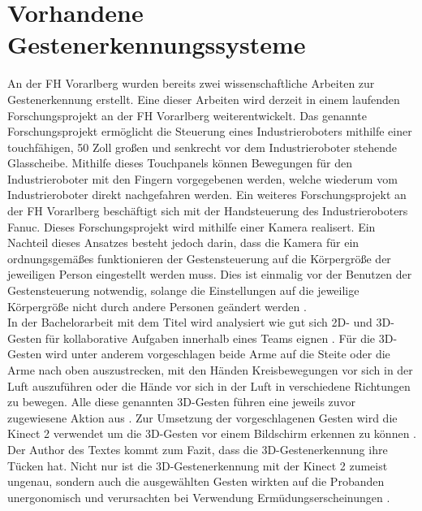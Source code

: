 

\section{Vorhandene Gestenerkennungssysteme}
An der FH Vorarlberg wurden bereits zwei wissenschaftliche Arbeiten zur Gestenerkennung erstellt. Eine dieser Arbeiten wird derzeit in einem laufenden Forschungsprojekt an der FH Vorarlberg weiterentwickelt. Das genannte Forschungsprojekt ermöglicht die Steuerung eines Industrieroboters mithilfe einer touchfähigen, 50 Zoll großen und senkrecht vor dem Industrieroboter stehende Glasscheibe. Mithilfe dieses Touchpanels können Bewegungen für den Industrieroboter mit den Fingern vorgegebenen werden, welche wiederum vom Industrieroboter direkt nachgefahren werden. Ein weiteres Forschungsprojekt an der FH Vorarlberg beschäftigt sich mit der Handsteuerung des Industrieroboters Fanuc. Dieses Forschungsprojekt wird mithilfe einer Kamera realisert. Ein Nachteil dieses Ansatzes besteht jedoch darin, dass die Kamera für ein ordnungsgemäßes funktionieren der Gestensteuerung auf die Körpergröße der jeweiligen Person eingestellt werden muss. Dies ist einmalig vor der Benutzen der Gestensteuerung notwendig, solange die Einstellungen auf die jeweilige Körpergröße nicht durch andere Personen geändert werden \cite{werth_konferenz_2019}.\\

In der Bachelorarbeit mit dem Titel  wird analysiert wie gut sich 2D- und 3D-Gesten für kollaborative Aufgaben innerhalb eines Teams eignen \cite[2\psqq]{graczyk_eignungsuntersuchung_nodate}. Für die 3D-Gesten wird unter anderem vorgeschlagen beide Arme auf die Steite oder die Arme nach oben auszustrecken, mit den Händen Kreisbewegungen vor sich in der Luft auszuführen oder die Hände vor sich in der Luft in verschiedene Richtungen zu bewegen. Alle diese genannten 3D-Gesten führen eine jeweils zuvor zugewiesene Aktion aus \cite[39\psqq]{graczyk_eignungsuntersuchung_nodate}. Zur Umsetzung der vorgeschlagenen Gesten wird die Kinect 2 verwendet um die 3D-Gesten vor einem Bildschirm erkennen zu können \cite[33\psqq]{graczyk_eignungsuntersuchung_nodate}. Der Author des Textes kommt zum Fazit, dass die 3D-Gestenerkennung ihre Tücken hat. Nicht nur ist die 3D-Gestenerkennung mit der Kinect 2 zumeist ungenau, sondern auch die ausgewählten Gesten wirkten auf die Probanden unergonomisch und verursachten bei Verwendung Ermüdungserscheinungen \cite[83\psq]{graczyk_eignungsuntersuchung_nodate}.\\

